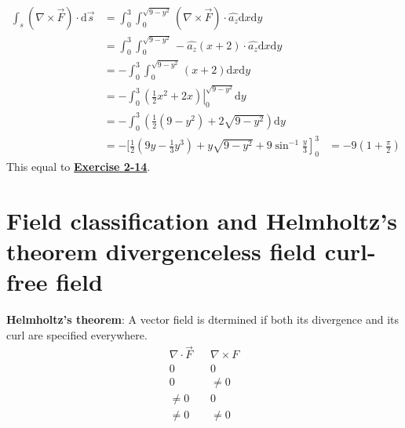 \documentclass[12pt, a4paper]{article}
\begin{document}
\begin{align*}
\int_s (\nabla \times \vec{F}) \cdot \text{d} \vec{s} 
&= \int_{0}^{3} \int_{0}^{\sqrt{9-y^2}} (\nabla \times \vec{F}) \cdot \hat{a_z} \text{d}x \text{d}y \\
&= \int_{0}^{3} \int_{0}^{\sqrt{9-y^2}} -\hat{a_z} (x+2) \cdot \hat{a_z} \text{d}x \text{d}y \\
&= - \int_{0}^{3} \int_{0}^{\sqrt{9-y^2}} (x+2) \text{d}x \text{d}y \\
&= -\int_{0}^{3} \left. (\frac{1}{2}x^2 + 2x) \right |_{0}^{\sqrt{9-y^2}}\text{d}y \\
&= -\int_{0}^{3} (\frac{1}{2} (9-y^2) + 2\sqrt{9-y^2}) \text{d}y \\
&=-\left. [\frac{1}{2}(9y -\frac{1}{3}y^3) + y\sqrt{9-y^2} + 9\sin^{-1}\frac{y}{3} \right]_{0}^{3}
&= -9(1 + \frac{\pi}{2})
\end{align*}
This equal to \hyperref[ex2-14]{\textbf{Exercise 2-14}}.
\newpage
\section*{Field classification and Helmholtz's theorem divergenceless field curl-free field}
\textbf{Helmholtz's theorem}: A vector field is dtermined if both its divergence and its curl are specified everywhere.
\begin{align*}
	\nabla \cdot \vec{F} && \nabla \times {F}\\
	0 && 0 \\
	0 && \neq0 \\
	\neq0 && 0 \\
	\neq0 && \neq0 \\
\end{align*}
\end{document}
